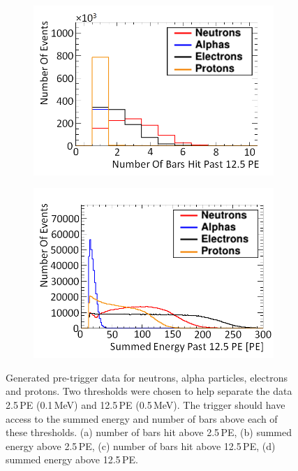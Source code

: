 \begin{figure}[!h]
\begin{subfigure}{.49\textwidth}
  \includegraphics[width=\linewidth]{Chapter4.5/Figs/preTrigNba12.5.png}
  \captionsetup{width=.9\linewidth}
  \caption{}
  \label{subFig:preTrigNba12.5}
\end{subfigure}
\begin{subfigure}{.49\textwidth}
  \centering
  \includegraphics[width=\linewidth]{Chapter4.5/Figs/preTrigSea12.5.png}
  \captionsetup{width=.9\linewidth}
  \caption{}
  \label{subFig:preTrigSea12.5}
\end{subfigure}
\caption[Generated pre trigger data for neutrons, alphas, electrons and protons.]{Generated pre-trigger data for neutrons, alpha particles, electrons and protons. Two thresholds were chosen to help separate the data 2.5\,PE (0.1\,MeV) and 12.5\,PE (0.5\,MeV). The trigger should have access to the summed energy and number of bars above each of these thresholds. (a) number of bars hit above 2.5\,PE, (b) summed energy above 2.5\,PE, (c) number of bars hit above 12.5\,PE, (d) summed energy above 12.5\,PE.}
\label{fig:preTriggerData}
\end{figure}

